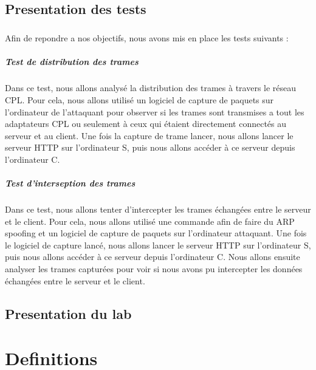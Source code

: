 \documentclass[a4paper,draft,twocolumn]{report}
\begin{document}
\section{Presentation des tests}
\paragraph{}Afin de repondre a nos objectifs, nous avons mis en place les tests suivants :
\paragraph{Test de distribution des trames} Dans ce test, nous allons analysé la distribution des trames à travers le réseau CPL. Pour cela, nous allons utilisé un logiciel de capture de paquets sur l'ordinateur de l'attaquant pour observer si les trames sont transmises a tout les adaptateurs CPL ou seulement à ceux qui étaient directement connectés au serveur et au client. Une fois la capture de trame lancer, nous allons lancer le serveur HTTP sur l'ordinateur S, puis nous allons accéder à ce serveur depuis l'ordinateur C. 

\paragraph{Test d'interseption des trames} Dans ce test, nous allons tenter d'intercepter les trames échangées entre le serveur et le client. Pour cela, nous allons utilisé une commande afin de faire du ARP spoofing et un logiciel de capture de paquets sur l'ordinateur attaquant. Une fois le logiciel de capture lancé, nous allons lancer le serveur HTTP sur l'ordinateur S, puis nous allons accéder à ce serveur depuis l'ordinateur C. Nous allons ensuite analyser les trames capturées pour voir si nous avons pu intercepter les données échangées entre le serveur et le client.

\section{Presentation du lab}



\appendix
\chapter{Definitions}
\section{}
\end{document}
